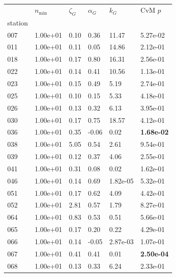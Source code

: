 \begin{figure}[htbp!]
    \centering
    {\footnotesize
    \begin{minipage}[t]{0.48\linewidth}
        \centering
        \begin{tabular}{llllll}
        \toprule
         & $n_{\min}$ & $\zeta_G$ & $\alpha_G$ & $k_G$ & CvM $p$ \\
        station &  &  &  &  &  \\
        \midrule
                    007 & 1.00e+01 & 0.10 & 0.36 & 11.47 & 5.27e-02\\
                    011 & 1.00e+01 & 0.11 & 0.05 & 14.86 & 2.12e-01\\
                    018 & 1.00e+01 & 0.17 & 0.80 & 16.31 & 2.56e-01\\
                    022 & 1.00e+01 & 0.14 & 0.41 & 10.56 & 1.13e-01\\
                    023 & 1.00e+01 & 0.15 & 0.49 & 5.19 & 2.74e-01\\
                    025 & 1.00e+01 & 0.10 & 0.15 & 5.33 & 4.18e-01\\
                    026 & 1.00e+01 & 0.13 & 0.32 & 6.13 & 3.95e-01\\
                    030 & 1.00e+01 & 0.17 & 0.75 & 18.57 & 4.12e-01\\
                    036 & 1.00e+01 & 0.35 & -0.06 & 0.02 & \textbf{1.68e-02}\\
                    038 & 1.00e+01 & 5.05 & 0.54 & 2.61 & 9.54e-01\\
                    039 & 1.00e+01 & 0.12 & 0.37 & 4.06 & 2.55e-01\\
                    041 & 1.00e+01 & 0.31 & 0.08 & 0.02 & 1.62e-01\\
                    046 & 1.00e+01 & 0.14 & 0.69 & 1.82e-05 & 5.32e-01\\
                    051 & 1.00e+01 & 0.17 & 0.62 & 4.09 & 4.42e-01\\
                    052 & 1.00e+01 & 2.81 & 0.57 & 1.79 & 8.27e-01\\
                    064 & 1.00e+01 & 0.83 & 0.53 & 0.51 & 5.66e-01\\
                    065 & 1.00e+01 & 0.17 & 0.20 & 0.22 & 4.29e-01\\
                    066 & 1.00e+01 & 0.14 & -0.05 & 2.87e-03 & 1.07e-01\\
                    067 & 1.00e+01 & 0.41 & 0.41 & 0.01 & \textbf{2.50e-04}\\
                    068 & 1.00e+01 & 0.13 & 0.33 & 6.24 & 2.33e-01\\

\end{tabular}
\end{minipage}}
\end{figure}
